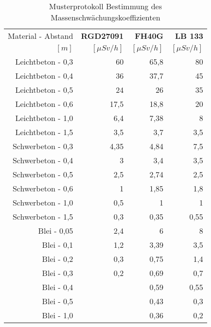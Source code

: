 \documentclass{article}
\begin{document}
\begin{table}[h!]
	\begin{center}
	
		\begin{tabular}{r|r|r|r}
      	Material - Abstand & \textbf{RGD27091} & \textbf{FH40G} & \textbf{LB 133} \\
      	$[m]$ & $[\mu Sv/h]$ & $[\mu Sv/h]$ & $[\mu Sv/h]$ \\
      	\hline
      	Leichtbeton - 0,3 & 60   & 65,8  & 80  \\
      	Leichtbeton - 0,4 & 36   & 37,7  & 45  \\
      	Leichtbeton - 0,5 & 24   & 26    & 35  \\
      	Leichtbeton - 0,6 & 17,5 & 18,8  & 20  \\
      	Leichtbeton - 1,0 & 6,4  & 7,38  & 8   \\
      	Leichtbeton - 1,5 & 3,5  & 3,7   & 3,5 \\
      	\hline
      	Schwerbeton - 0,3 & 4,35 & 4,84 & 7,5 \\
      	Schwerbeton - 0,4 & 3   	 & 3,4  & 3,5 \\
      	Schwerbeton - 0,5 & 2,5  & 2,74 & 2,5 \\
      	Schwerbeton - 0,6 & 1    & 1,85 & 1,8 \\
      	Schwerbeton - 1,0 & 0,5  & 1    & 1   \\
      	Schwerbeton - 1,5 & 0,3  & 0,35 & 0,55\\
      	\hline
      	Blei - 0,05 & 2,4 & 6    & 8 \\
      	Blei - 0,1  & 1,2 & 3,39 & 3,5 \\
      	Blei - 0,2  & 0,3 & 0,75 & 1,4 \\
      	Blei - 0,3  & 0,2 & 0,69 & 0,7 \\
      	Blei - 0,4  &     & 0,59 & 0,55   \\
      	Blei - 0,5  &     & 0,43 & 0,3\\
      	Blei - 1,0  &     & 0,36 & 0,2\\
      
    	\end{tabular}
    	\caption{Musterprotokoll Bestimmung des Massenschw{\"a}chungskoeffizienten}
    	\label{tab:table2}

	\end{center}
\end{table}
\end{document}
